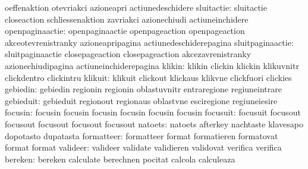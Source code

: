                            oeffenaktion              otevriakci
                           azioneapri                actiunedeschidere
               sluitactie: sluitactie                closeaction
                           schliessenaktion          zavriakci
                           azionechiudi              actiuneinchidere
          openpaginaactie: openpaginaactie           openpageaction
                           openpageaction            akceotevrenistranky
                           azioneapripagina          actiunedeschiderepagina %
         sluitpaginaactie: sluitpaginaactie          closepageaction
                           closepageaction           akcezavrenistranky
                           azionechiudipagina        actiuneinchiderepagina %
                   klikin: klikin                    clickin
                           klickin                   klikuvnitr
                           clickdentro               clickintru
                  klikuit: klikuit                   clickout
                           klickaus                  klikvne
                           clickfuori                clickies
                 gebiedin: gebiedin                  regionin
                           regionin                  oblastuvnitr
                           entraregione              regiuneintrare
                gebieduit: gebieduit                 regionout
                           regionaus                 oblastvne
                           esciregione               regiuneiesire
                  focusin: focusin                   focusin
                           focusin                   focusin
                           focusin                   focusin
                 focusuit: focusuit                  focusout
                           focusout                  focusout
                           focusout                  focusout
                  natoets: natoets                   afterkey
                           nachtaste                 klavesapo
                           dopotasto                 dupatasta
               formatteer: formatteer                format
                           formatieren               formatovat
                           format                    format %
                 valideer: valideer                  validate
                           validieren                validovat
                           verifica                  verifica
                  bereken: bereken                   calculate
                           berechnen                 pocitat
                           calcola                   calculeaza
